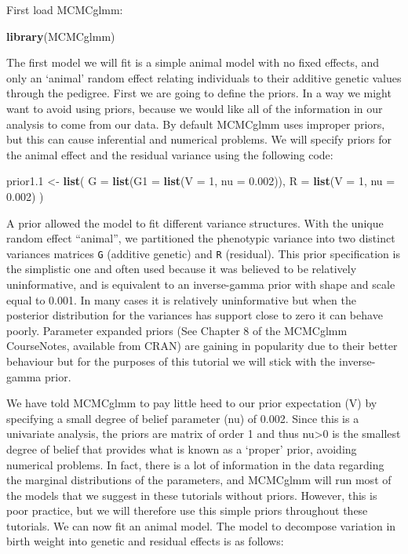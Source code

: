 \documentclass[
  12pt,
]{book}
\newenvironment{Shaded}{\begin{snugshade}}{\end{snugshade}}
\newcommand{\DataTypeTok}[1]{\textcolor[rgb]{0.13,0.29,0.53}{#1}}
\newcommand{\DecValTok}[1]{\textcolor[rgb]{0.00,0.00,0.81}{#1}}
\newcommand{\FloatTok}[1]{\textcolor[rgb]{0.00,0.00,0.81}{#1}}
\newcommand{\KeywordTok}[1]{\textcolor[rgb]{0.13,0.29,0.53}{\textbf{#1}}}
\newcommand{\NormalTok}[1]{#1}
\newcommand{\StringTok}[1]{\textcolor[rgb]{0.31,0.60,0.02}{#1}}
\begin{document}
First load MCMCglmm:

\begin{Shaded}
\begin{Highlighting}[]
\KeywordTok{library}\NormalTok{(MCMCglmm)}
\end{Highlighting}
\end{Shaded}

The first model we will fit is a simple animal model with no fixed effects, and only an `animal' random effect relating individuals to their additive genetic values through the pedigree.
First we are going to define the priors. In a way we might want to avoid using priors, because we would like all of the information in our analysis to come from our data.
By default MCMCglmm uses improper priors, but this can cause inferential and numerical problems. We will specify priors for the animal effect and the residual variance using the following code:

\begin{Shaded}
\begin{Highlighting}[]
\NormalTok{prior1}\FloatTok{.1}\NormalTok{ \textless{}{-}}\StringTok{ }\KeywordTok{list}\NormalTok{(}
  \DataTypeTok{G =} \KeywordTok{list}\NormalTok{(}\DataTypeTok{G1 =} \KeywordTok{list}\NormalTok{(}\DataTypeTok{V =} \DecValTok{1}\NormalTok{, }\DataTypeTok{nu =} \FloatTok{0.002}\NormalTok{)),}
  \DataTypeTok{R =} \KeywordTok{list}\NormalTok{(}\DataTypeTok{V =} \DecValTok{1}\NormalTok{, }\DataTypeTok{nu =} \FloatTok{0.002}\NormalTok{)}
\NormalTok{)}
\end{Highlighting}
\end{Shaded}

A prior allowed the model to fit different variance structures. With the unique random effect ``animal'', we partitioned the phenotypic variance into two distinct variances matrices \texttt{G} (additive genetic) and \texttt{R} (residual).
This prior specification is the simplistic one and often used because it was believed to be relatively uninformative, and is equivalent to an inverse-gamma prior with shape and scale equal to 0.001. In many cases it is relatively uninformative but when the posterior distribution for the variances has support close to zero it can behave poorly. Parameter expanded priors (See Chapter 8 of the MCMCglmm CourseNotes, available from CRAN) are gaining in popularity due to their better behaviour but for the purposes of this tutorial we will stick with the inverse-gamma prior.

We have told MCMCglmm to pay little heed to our prior expectation (V) by specifying a small degree of belief parameter (nu) of 0.002. Since this is a univariate analysis, the priors are matrix of order 1 and thus nu\textgreater0 is the smallest degree of belief that provides what is known as a `proper' prior, avoiding numerical problems. In fact, there is a lot of information in the data regarding the marginal distributions of the parameters, and MCMCglmm will run most of the models that we suggest in these tutorials without priors. However, this is poor practice, but we will therefore use this simple priors throughout these tutorials. We can now fit an animal model. The model to decompose variation in birth weight into genetic and residual effects is as follows:
\end{document}
